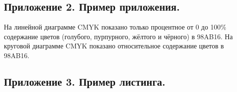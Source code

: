 \documentclass[12pt, a4paper]{report}
\begin{document}
\subsection*{Приложение 2. Пример приложения.}

На линейной диаграмме CMYK показано только процентное от 0 до 100\% 
содержание цветов (голубого, пурпурного, жёлтого и чёрного) в 98AB16. 
На круговой диаграмме CMYK показано относительное содержание цветов в 98AB16.

\subsection*{Приложение 3. Пример листинга.}

% 
% 
\end{document}

